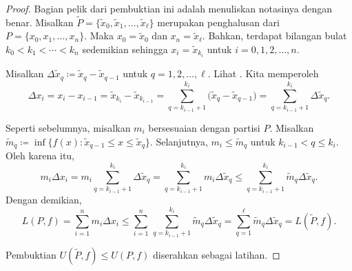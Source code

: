 \begin{proof}
Bagian pelik dari pembuktian ini adalah menuliskan notasinya dengan benar.
Misalkan $\widetilde{P} = \{ \widetilde{x}_0, \widetilde{x}_1, \ldots,
\widetilde{x}_{\ell} \}$ merupakan
penghalusan dari 
$P = \{ x_0, x_1, \ldots, x_n \}$.  Maka
$x_0 = \widetilde{x}_0$ dan 
$x_n = \widetilde{x}_{\ell}$.  Bahkan, terdapat bilangan bulat
$k_0 < k_1 < \cdots < k_n$ sedemikian sehingga $x_i = \widetilde{x}_{k_i}$ untuk
$i=0,1,2,\ldots,n$.

Misalkan $\Delta \widetilde{x}_q \coloneqq \widetilde{x}_q - \widetilde{x}_{q-1}$ untuk
$q=1,2,\ldots,\ell$.
Lihat .
Kita memperoleh 
\begin{equation*}
\Delta x_i
=
x_i - x_{i-1} =
\widetilde{x}_{k_i} - \widetilde{x}_{k_{i-1}} =
\sum_{q=k_{i-1}+1}^{k_i} 
\bigl(\widetilde{x}_{q} - \widetilde{x}_{q-1}\bigr)
=
\sum_{q=k_{i-1}+1}^{k_i} \Delta \widetilde{x}_q .
\end{equation*}
\begin{myfigureht}
\caption{Penghalusan suatu subinterval.  Perhatikan bahwa $\Delta x_i =
\Delta \widetilde{x}_{q-2} +
\Delta \widetilde{x}_{q-1} +
\Delta \widetilde{x}_{q}$,
dan juga
$k_{i-1}+1 = q-2$ dan
$k_{i} = q$.\label{fig:refinement}}
\end{myfigureht}

Seperti sebelumnya, misalkan $m_i$ bersesuaian dengan partisi $P$.
Misalkan $\widetilde{m}_q \coloneqq \inf \bigl\{ f(x) : \widetilde{x}_{q-1} \leq x \leq
\widetilde{x}_q \bigr\}$.
Selanjutnya, $m_i \leq \widetilde{m}_q$ untuk $k_{i-1} < q \leq k_i$.  Oleh karena itu,
\begin{equation*}
m_i \Delta x_i
=
m_i \sum_{q=k_{i-1}+1}^{k_i} \Delta \widetilde{x}_q
=
\sum_{q=k_{i-1}+1}^{k_i} m_i \Delta \widetilde{x}_q
\leq
\sum_{q=k_{i-1}+1}^{k_i} \widetilde{m}_q \Delta \widetilde{x}_q .
\end{equation*}
Dengan demikian,
\begin{equation*}
L(P,f) =
\sum_{i=1}^n m_i \Delta x_i
\leq
\sum_{i=1}^n \,
\sum_{q=k_{i-1}+1}^{k_i} \widetilde{m}_q \Delta \widetilde{x}_q
=
\sum_{q=1}^{\ell}
\widetilde{m}_q \Delta \widetilde{x}_q = L(\widetilde{P},f).
\end{equation*}

Pembuktian $U(\widetilde{P},f) \leq U(P,f)$ diserahkan sebagai latihan.
\end{proof}

